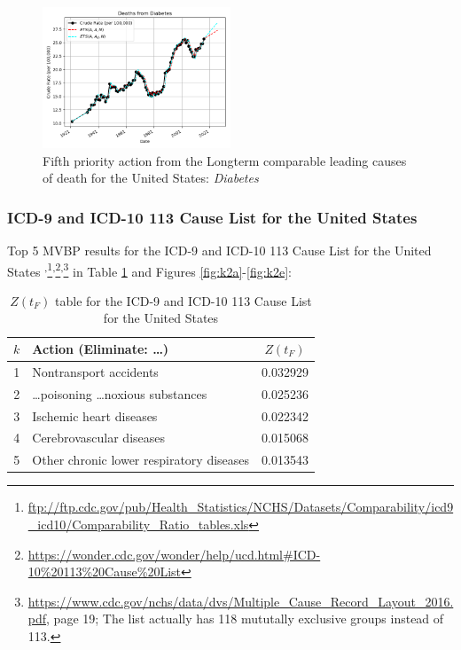 \documentclass[10pt, a4paper, twocolumn]{IEEEconf}
\begin{document}
\begin{figure}[H]
  \centering
  \includegraphics[width=0.5\textwidth]{results/US_ICD_LONGTERM_COMPARABLE_LEADING/Diabetes_ets.png}
  \caption{Fifth priority action from the Longterm comparable leading causes of death for the United States: \textit{Diabetes}}\label{fig:k1e}
\end{figure}

\clearpage

\subsubsection{ICD-9 and ICD-10 113 Cause List for the United States}

Top 5 MVBP results for the ICD-9 and ICD-10 113 Cause List for the United States \citep{nbermortality,anderson2001comparability,icdcomparabilityratios,centers2017underlying}\textsuperscript{,}\footnote{\scriptsize{\url{ftp://ftp.cdc.gov/pub/Health_Statistics/NCHS/Datasets/Comparability/icd9_icd10/Comparability_Ratio_tables.xls}}}\textsuperscript{,}\footnote{\scriptsize{\url{https://wonder.cdc.gov/wonder/help/ucd.html\#ICD-10\%20113\%20Cause\%20List}}}\textsuperscript{,}\footnote{\scriptsize{\url{https://www.cdc.gov/nchs/data/dvs/Multiple_Cause_Record_Layout_2016.pdf}, page 19; The list actually has 118 mututally exclusive groups instead of 113.}} in Table \ref{table:ztable2} and Figures \ref{fig:k2a}-\ref{fig:k2e}:

\begin{table}[H]
  \centering
  \begin{tabular}{clc}
    \toprule
      $k$ & Action (Eliminate: \ldots) & $Z(t_F)$ \\
    \midrule
      1 &                      Nontransport accidents & 0.032929 \\
      2 &  \ldots poisoning \ldots noxious substances & 0.025236 \\
      3 &                     Ischemic heart diseases & 0.022342 \\
      4 &                    Cerebrovascular diseases & 0.015068 \\
      5 &    Other chronic lower respiratory diseases & 0.013543 \\
  \end{tabular}
  \caption{$Z(t_F)$ table for the ICD-9 and ICD-10 113 Cause List for the United States}
  \label{table:ztable2}
\end{table}
\end{document}
